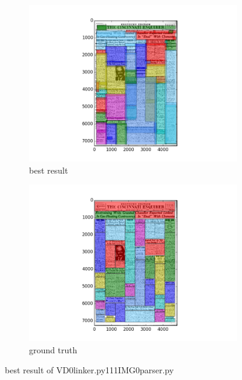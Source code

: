 \documentclass[a4paper,10pt]{article}
\begin{document}
					\begin{figure}
					\centering
					\begin{subfigure}{.5\textwidth}
					  \centering
					  \includegraphics[width=10cm]
					{VD0linker.py111IMG0parser.py.best.png}
					  \caption{best result}
					  \label{fig:sub1}
					\end{subfigure}%
					\begin{subfigure}{.5\textwidth}
					  \centering
					  \includegraphics[width=10cm]
					{VD0linker.py111IMG0parser.py.gt.best.png}
					  \caption{ground truth}
					  \label{fig:sub2}
					\end{subfigure}
					\caption
					{best result of VD0linker.py111IMG0parser.py}
					\label{fig:test}
					\end{figure}
					
\end{document}
